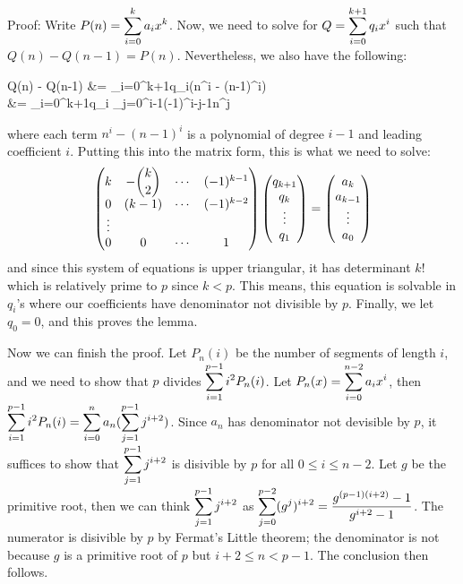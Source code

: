 \documentclass[11pt,a4paper]{article}
\begin{document}
\begin{enumerate}
	Proof: Write $P(n) = \displaystyle\sum_{i=0}^k a_ix^{k}$. Now, we need to solve for $Q=\displaystyle\sum_{i=0}^{k+1}q_ix^i$ such that $Q(n)-Q(n-1) = P(n)$. Nevertheless, we also have the following: 
	\begin{flalign*}
		Q(n) - Q(n-1)
		&= \dsum_{i=0}^{k+1}q_i(n^i - (n-1)^i)
		\\&= \dsum_{i=0}^{k+1}q_i \dsum_{j=0^{i-1}}(-1)^{i-j-1}n^j
	\end{flalign*}
	where each term $n^i-(n-1)^i$ is a polynomial of degree $i-1$ and leading coefficient $i$. 
	Putting this into the matrix form, this is what we need to solve: 
	\[
	\begin{pmatrix}
		k & -\dbinom{k}{2} & \cdots & (-1)^{k-1}\\
		0 & (k-1) & \cdots & (-1)^{k-2}\\
		\vdots\\
		0 & 0 & \cdots & 1\\
	\end{pmatrix}
	\begin{pmatrix}
		q_{k+1} \\ q_{k} \\ \vdots \\ q_1\\
	\end{pmatrix}
	=
	\begin{pmatrix}
	a_{k} \\ a_{k-1} \\ \vdots \\ a_0\\
	\end{pmatrix}
	\]
	and since this system of equations is upper triangular, it has determinant $k!$ which is relatively prime to $p$ since $k<p$. This means, this equation is solvable in $q_i$'s where our coefficients have denominator not divisible by $p$. Finally, we let $q_0=0$, and this proves the lemma. 
	
	Now we can finish the proof. Let $P_n(i)$ be the number of segments of length $i$, and we need to show that $p$ divides $\displaystyle\sum_{i=1}^{p-1} i^2P_n(i)$. 
	Let $P_n(x) = \displaystyle\sum_{i=0}^{n-2} a_ix^i$, then $\displaystyle\sum_{i=1}^{p-1} i^2P_n(i) = \displaystyle\sum_{i=0}^{n} a_n (\displaystyle\sum_{j=1}^{p-1} j^{i+2})$. 
	Since $a_n$ has denominator not devisible by $p$, it suffices to show that $\displaystyle\sum_{j=1}^{p-1} j^{i+2}$ is disivible by $p$ for all $0\le i\le n-2$. Let $g$ be the primitive root, then we can think $\displaystyle\sum_{j=1}^{p-1} j^{i+2}$ as $\displaystyle\sum_{j=0}^{p-2} (g^j)^{i+2}=\dfrac{g^{(p-1)(i+2)}-1}{g^{i+2}-1}$. 
	The numerator is disivible by $p$ by Fermat's Little theorem; the denominator is not because $g$ is a primitive root of $p$ but $i+2\le n<p-1$. The conclusion then follows. 
\end{enumerate}
\end{document}
